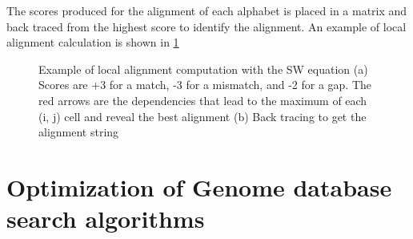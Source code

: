\documentclass[12pt,twoside]{article}
\begin{document}
The scores produced for the alignment of each alphabet is placed in a matrix and back traced from the highest
score to identify the alignment. An example of local alignment calculation is shown in \cref{fig:alignexample}
\begin{figure}%
    \centering
    \qquad
    \caption{Example of local alignment computation with the SW equation (a) Scores are +3 for a match,
	-3 for a mismatch, and -2 for a gap. The red arrows are the dependencies that
	lead to the maximum of each (i, j) cell and reveal the best alignment (b) Back tracing to get the alignment string}
    \label{fig:alignexample}
\end{figure}

\section{Optimization of Genome database search algorithms}
\label{sec:designtech}
\end{document}
